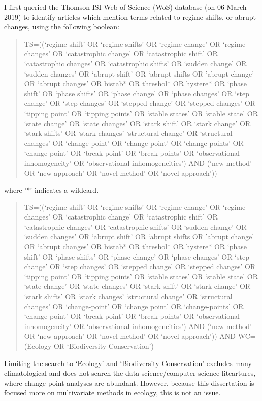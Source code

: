 \documentclass[12pt,twoside,openany]{reedthesis}
\begin{document}
I first queried the Thomson-ISI Web of Science (WoS) database (on 06
March 2019) to identify articles which mention terms related to regime
shifts, or abrupt changes, using the following boolean:
\begin{quote}
TS=((`regime shift' OR `regime shifts' OR `regime change' OR `regime
changes' OR `catastrophic change' OR `catastrophic shift' OR
`catastrophic changes' OR `catastrophic shifts' OR `sudden change' OR
`sudden changes' OR `abrupt shift' OR `abrupt shifts OR 'abrupt change'
OR `abrupt changes' OR bistab* OR threshol* OR hystere* OR `phase shift'
OR `phase shifts' OR `phase change' OR `phase changes' OR `step change'
OR `step changes' OR `stepped change' OR `stepped changes' OR `tipping
point' OR `tipping points' OR `stable states' OR `stable state' OR
`state change' OR `state changes' OR `stark shift' OR `stark change' OR
`stark shifts' OR `stark changes' `structural change' OR `structural
changes' OR `change-point' OR `change point' OR `change-points' OR
`change point' OR `break point' OR `break points' OR `observational
inhomogeneity' OR `observational inhomogeneities') AND (`new method' OR
`new approach' OR `novel method' OR `novel approach'))
\end{quote}
where '*' indicates a wildcard.
\begin{quote}
TS=((`regime shift' OR `regime shifts' OR `regime change' OR `regime
changes' OR `catastrophic change' OR `catastrophic shift' OR
`catastrophic changes' OR `catastrophic shifts' OR `sudden change' OR
`sudden changes' OR `abrupt shift' OR `abrupt shifts OR 'abrupt change'
OR `abrupt changes' OR bistab* OR threshol* OR hystere* OR `phase shift'
OR `phase shifts' OR `phase change' OR `phase changes' OR `step change'
OR `step changes' OR `stepped change' OR `stepped changes' OR `tipping
point' OR `tipping points' OR `stable states' OR `stable state' OR
`state change' OR `state changes' OR `stark shift' OR `stark change' OR
`stark shifts' OR `stark changes' `structural change' OR `structural
changes' OR `change-point' OR `change point' OR `change-points' OR
`change point' OR `break point' OR `break points' OR `observational
inhomogeneity' OR `observational inhomogeneities') AND (`new method' OR
`new approach' OR `novel method' OR `novel approach')) AND WC=(Ecology
OR `Biodiversity Conservation')
\end{quote}
Limiting the search to `Ecology' and `Biodiversity Conservation'
excludes many climatological and does not search the data
science/computer science liteartures, where change-point analyses are
abundant. However, because this dissertation is focused more on
multivariate methods in ecology, this is not an issue.
\end{document}
